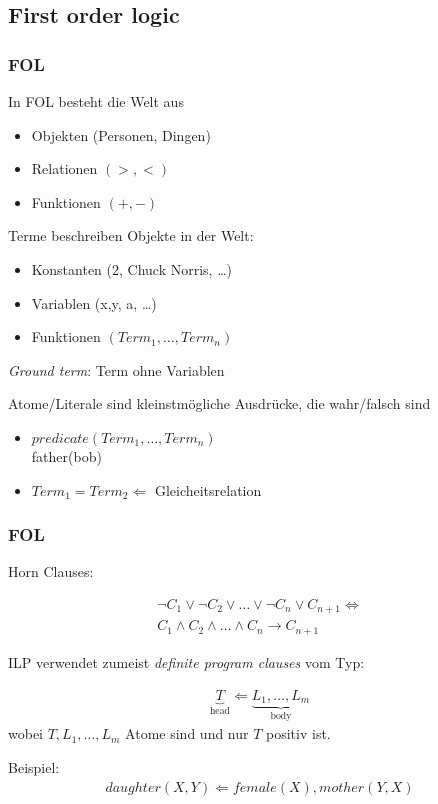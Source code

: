 \subsection{First order logic}
\begin{frame}
	\frametitle{FOL}
	\begin{block}{}
	In FOL besteht die Welt aus
	\begin{itemize}
		\item Objekten   (Personen, Dingen)
		\item Relationen $(>, <)$
		\item Funktionen $(+, -)$
	\end{itemize}
	\end{block}

	Terme beschreiben Objekte in der Welt:
	\begin{itemize}
		\item Konstanten ($2$, Chuck Norris, \ldots)
		\item Variablen (x,y, a, \ldots)
		\item Funktionen $(Term_1, \ldots, Term_n)$
	\end{itemize}
	\textit{Ground term}: Term ohne Variablen


	\begin{block}{}
		Atome/Literale sind kleinstmögliche Ausdrücke, die wahr/falsch sind
		\begin{itemize}
			\item $predicate(Term_1, \ldots, Term_n)$\\ 
				father(bob)
			\item $Term_1 = Term_2 \Leftarrow$ Gleicheitsrelation
		\end{itemize}
	\end{block}

\end{frame}

\begin{frame}
	\frametitle{FOL}
	Horn Clauses:

	\begin{align*}
		\neg C_1 \vee \neg C_2 \vee \ldots \vee \neg C_n  \vee C_{n+1} \Leftrightarrow\\
		C_1 \wedge C_2 \wedge \ldots \wedge C_n  \rightarrow C_{n+1}
	\end{align*}

	ILP verwendet zumeist \textit{definite program clauses} vom Typ:

	\begin{align*}
		\underbrace{T}_{\text{head}} \Leftarrow \underbrace{L_1, \ldots, L_m}_{\text{body}}
	\end{align*}
	wobei $T, L_1, \ldots, L_m$ Atome sind und nur $T$ positiv ist.

	Beispiel:
	\begin{align*}
		daughter(X,Y) \Leftarrow female(X), mother(Y, X)
	\end{align*}
\end{frame}

